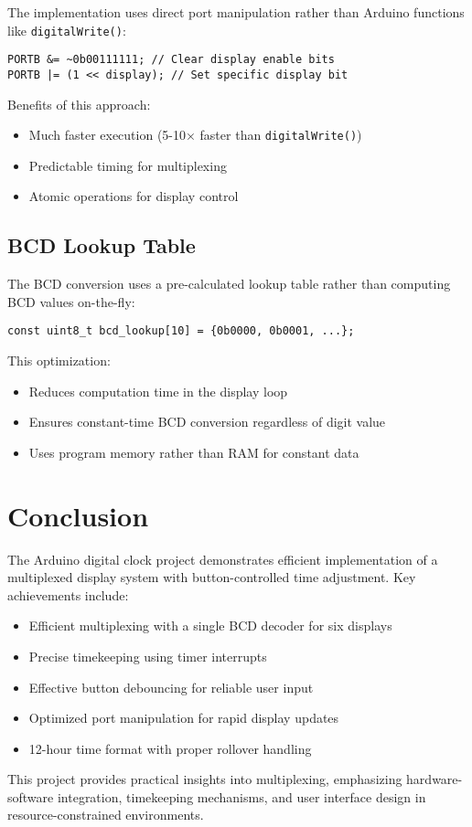 \documentclass[12pt,a4paper]{article}
\begin{document}
The implementation uses direct port manipulation rather than Arduino functions like \texttt{digitalWrite()}:

\begin{lstlisting}
PORTB &= ~0b00111111; // Clear display enable bits
PORTB |= (1 << display); // Set specific display bit
\end{lstlisting}

Benefits of this approach:
\begin{itemize}
    \item Much faster execution (5-10× faster than \texttt{digitalWrite()})
    \item Predictable timing for multiplexing
    \item Atomic operations for display control
\end{itemize}

\subsection{BCD Lookup Table}

The BCD conversion uses a pre-calculated lookup table rather than computing BCD values on-the-fly:

\begin{lstlisting}
const uint8_t bcd_lookup[10] = {0b0000, 0b0001, ...};
\end{lstlisting}

This optimization:
\begin{itemize}
    \item Reduces computation time in the display loop
    \item Ensures constant-time BCD conversion regardless of digit value
    \item Uses program memory rather than RAM for constant data
\end{itemize}

\section{Conclusion}

The Arduino digital clock project demonstrates efficient implementation of a multiplexed display system with button-controlled time adjustment. Key achievements include:

\begin{itemize}
    \item Efficient multiplexing with a single BCD decoder for six displays
    \item Precise timekeeping using timer interrupts
    \item Effective button debouncing for reliable user input
    \item Optimized port manipulation for rapid display updates
    \item 12-hour time format with proper rollover handling
\end{itemize}

This project provides practical insights into multiplexing, emphasizing hardware-software integration, timekeeping mechanisms, and user interface design in resource-constrained environments.
\end{document}
